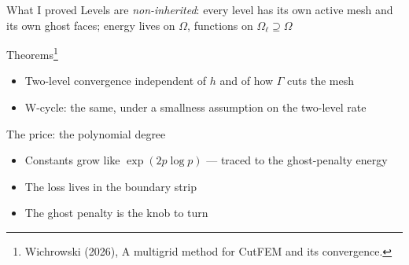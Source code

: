 \documentclass{beamer}
\begin{document}
\begin{frame}{What I proved }
    Levels are \emph{non-inherited}: every level has its own active mesh and its own ghost faces;
    energy lives on $\Omega$, functions on $\Omega_\ell \supseteq \Omega$

    \begin{block}{Theorems\footnote{Wichrowski (2026), A multigrid method for CutFEM and its convergence.}}
        \begin{itemize}
            \item Two-level convergence \alert{independent of $h$ and of how $\Gamma$ cuts the mesh}
            \item W-cycle: the same, under a smallness assumption on the two-level rate
        \end{itemize}
    \end{block}
    \vfill
    \pause
    \begin{block}{The price: the polynomial degree}
        \begin{itemize}
            \item Constants grow like $\exp(2p\log p)$ --- traced to the \alert{ghost-penalty energy}
            \item The loss lives in the \alert{boundary strip}
            \item The ghost penalty is the knob to turn
        \end{itemize}
    \end{block}
\end{frame}
\end{document}
